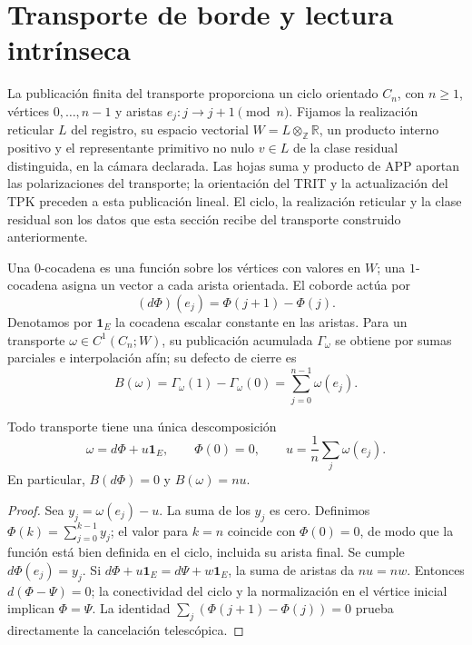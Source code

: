 \section{Transporte de borde y lectura intrínseca}
\label{x_reciprocidad:vii:sec:observador-ciclo}

La publicación finita del transporte proporciona un ciclo orientado
\(C_n\), con \(n\geq1\), vértices \(0,\ldots,n-1\) y aristas
\(e_j:j\longrightarrow j+1\pmod n\). Fijamos la realización reticular
\(L\) del registro, su espacio vectorial
\(W=L\otimes_{\mathbb Z}\mathbb R\), un producto interno positivo y
el representante primitivo no nulo \(v\in L\) de la clase residual
distinguida, en la cámara declarada. Las hojas suma y producto de APP
aportan las polarizaciones del transporte; la orientación del TRIT y la
actualización del TPK preceden a esta publicación lineal. El ciclo,
la realización reticular y la clase residual son los datos que esta
sección recibe del transporte construido anteriormente.

Una \(0\)-cocadena es una función sobre los vértices con valores en
\(W\); una \(1\)-cocadena asigna un vector a cada arista orientada.
El coborde actúa por
\[
 (d\Phi)(e_j)=\Phi(j+1)-\Phi(j).
\]
Denotamos por \(\mathbf1_E\) la cocadena escalar constante en las
aristas. Para un transporte \(\omega\in C^1(C_n;W)\), su publicación
acumulada \(\Gamma_\omega\) se obtiene por sumas parciales e
interpolación afín; su defecto de cierre es
\begin{equation}
 B(\omega)=\Gamma_\omega(1)-\Gamma_\omega(0)
 =\sum_{j=0}^{n-1}\omega(e_j).
 \label{x_reciprocidad:vii:eq:observador-defecto}
\end{equation}

\begin{theorem}
\label{x_reciprocidad:vii:thm:observador-descomposicion}
Todo transporte tiene una única descomposición
\[
 \omega=d\Phi+u\mathbf1_E,\qquad \Phi(0)=0,
 \qquad u=\frac1n\sum_j\omega(e_j).
\]
En particular, \(B(d\Phi)=0\) y \(B(\omega)=nu\).
\end{theorem}

\begin{proof}
Sea \(y_j=\omega(e_j)-u\). La suma de los \(y_j\) es cero.
Definimos \(\Phi(k)=\sum_{j=0}^{k-1}y_j\); el valor para \(k=n\)
coincide con \(\Phi(0)=0\), de modo que la función está bien definida
en el ciclo, incluida su arista final. Se cumple \(d\Phi(e_j)=y_j\).
Si \(d\Phi+u\mathbf1_E=d\Psi+w\mathbf1_E\), la suma de aristas da
\(nu=nw\). Entonces \(d(\Phi-\Psi)=0\); la conectividad del ciclo
y la normalización en el vértice inicial implican \(\Phi=\Psi\).
La identidad \(\sum_j(\Phi(j+1)-\Phi(j))=0\) prueba directamente
la cancelación telescópica.
\end{proof}

